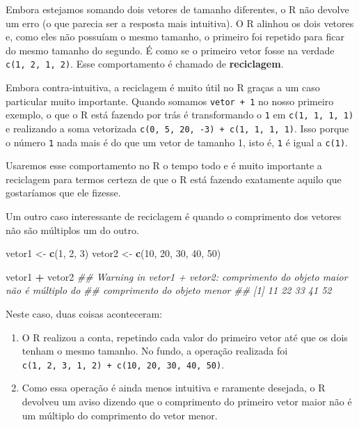 \documentclass[]{book}
\newenvironment{Shaded}{\begin{snugshade}}{\end{snugshade}}
\newcommand{\CommentTok}[1]{\textcolor[rgb]{0.56,0.35,0.01}{\textit{#1}}}
\newcommand{\DecValTok}[1]{\textcolor[rgb]{0.00,0.00,0.81}{#1}}
\newcommand{\KeywordTok}[1]{\textcolor[rgb]{0.13,0.29,0.53}{\textbf{#1}}}
\newcommand{\NormalTok}[1]{#1}
\newcommand{\OperatorTok}[1]{\textcolor[rgb]{0.81,0.36,0.00}{\textbf{#1}}}
\newcommand{\StringTok}[1]{\textcolor[rgb]{0.31,0.60,0.02}{#1}}
\begin{document}
Embora estejamos somando dois vetores de tamanho diferentes, o R não devolve um erro (o que parecia ser a resposta mais intuitiva). O R alinhou os dois vetores e, como eles não possuíam o mesmo tamanho, o primeiro foi repetido para ficar do mesmo tamanho do segundo. É como se o primeiro vetor fosse na verdade \texttt{c(1,\ 2,\ 1,\ 2)}. Esse comportamento é chamado de \textbf{reciclagem}.

Embora contra-intuitiva, a reciclagem é muito útil no R graças a um caso particular muito importante. Quando somamos \texttt{vetor\ +\ 1} no nosso primeiro exemplo, o que o R está fazendo por trás é transformando o \texttt{1} em \texttt{c(1,\ 1,\ 1,\ 1)} e realizando a soma vetorizada \texttt{c(0,\ 5,\ 20,\ -3)\ +\ c(1,\ 1,\ 1,\ 1)}. Isso porque o número \texttt{1} nada mais é do que um vetor de tamanho 1, isto é, \texttt{1} é igual a \texttt{c(1)}.

Usaremos esse comportamento no R o tempo todo e é muito importante a reciclagem para termos certeza de que o R está fazendo exatamente aquilo que gostaríamos que ele fizesse.

Um outro caso interessante de reciclagem é quando o comprimento dos vetores não são múltiplos um do outro.

\begin{Shaded}
\begin{Highlighting}[]
\NormalTok{vetor1 <-}\StringTok{ }\KeywordTok{c}\NormalTok{(}\DecValTok{1}\NormalTok{, }\DecValTok{2}\NormalTok{, }\DecValTok{3}\NormalTok{)}
\NormalTok{vetor2 <-}\StringTok{ }\KeywordTok{c}\NormalTok{(}\DecValTok{10}\NormalTok{, }\DecValTok{20}\NormalTok{, }\DecValTok{30}\NormalTok{, }\DecValTok{40}\NormalTok{, }\DecValTok{50}\NormalTok{)}

\NormalTok{vetor1 }\OperatorTok{+}\StringTok{ }\NormalTok{vetor2}
\CommentTok{## Warning in vetor1 + vetor2: comprimento do objeto maior não é múltiplo do}
\CommentTok{## comprimento do objeto menor}
\CommentTok{## [1] 11 22 33 41 52}
\end{Highlighting}
\end{Shaded}

Neste caso, duas coisas aconteceram:

\begin{enumerate}
\def\labelenumi{\arabic{enumi}.}
\item
  O R realizou a conta, repetindo cada valor do primeiro vetor até que os dois tenham o mesmo tamanho. No fundo, a operação realizada foi \texttt{c(1,\ 2,\ 3,\ 1,\ 2)\ +\ c(10,\ 20,\ 30,\ 40,\ 50)}.
\item
  Como essa operação é ainda menos intuitiva e raramente desejada, o R devolveu um aviso dizendo que o comprimento do primeiro vetor maior não é um múltiplo do comprimento do vetor menor.
\end{enumerate}
\end{document}
